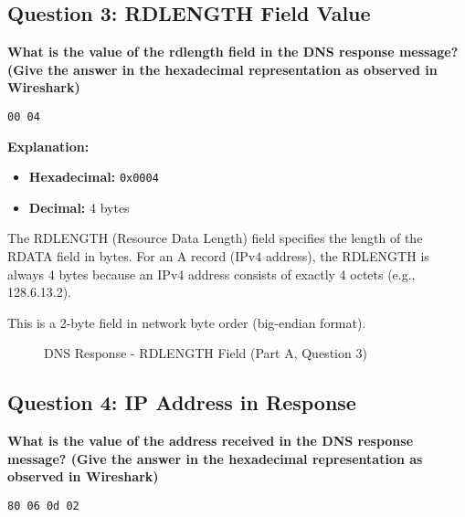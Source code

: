 \documentclass[11pt,letterpaper]{article}
\begin{document}
\newpage

\subsection{Question 3: RDLENGTH Field Value}

\textbf{What is the value of the rdlength field in the DNS response message? (Give the answer in the hexadecimal representation as observed in Wireshark)}

\begin{hexbox}
\begin{lstlisting}[style=hexstyle]
00 04
\end{lstlisting}
\end{hexbox}

\textbf{Explanation:}
\begin{itemize}
    \item \textbf{Hexadecimal:} \texttt{0x0004}
    \item \textbf{Decimal:} 4 bytes
\end{itemize}

The RDLENGTH (Resource Data Length) field specifies the length of the RDATA field in bytes. For an A record (IPv4 address), the RDLENGTH is always 4 bytes because an IPv4 address consists of exactly 4 octets (e.g., 128.6.13.2).

This is a 2-byte field in network byte order (big-endian format).

\begin{figure}[h]
    \centering
    \caption{DNS Response - RDLENGTH Field (Part A, Question 3)}
    \label{fig:parta_q3}
\end{figure}

\newpage

\subsection{Question 4: IP Address in Response}

\textbf{What is the value of the address received in the DNS response message? (Give the answer in the hexadecimal representation as observed in Wireshark)}

\begin{hexbox}
\begin{lstlisting}[style=hexstyle]
80 06 0d 02
\end{lstlisting}
\end{hexbox}
\end{document}
